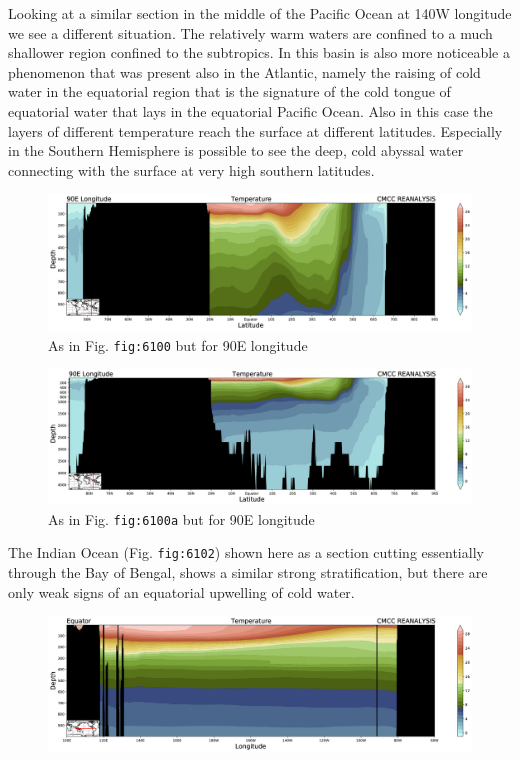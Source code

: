 Looking at a similar section in the middle of the Pacific Ocean at 140W
longitude we see a different situation. The relatively warm waters are
confined to a much shallower region confined to the subtropics. In this
basin is also more noticeable a phenomenon that was present also in the
Atlantic, namely the raising of cold water in the equatorial region that
is the signature of the cold tongue of equatorial water that lays in the
equatorial Pacific Ocean. Also in this case the layers of different
temperature reach the surface at different latitudes. Especially in the
Southern Hemisphere is possible to see the deep, cold abyssal water
connecting with the surface at very high southern latitudes.

\begin{figure}
\centering
\includegraphics[width = .7 \textwidth]{figs/GD/Sect90E1000.png}
\caption{As in Fig. \texttt{fig:6100} but for 90E longitude}
\end{figure}

\begin{figure}
\centering
\includegraphics[width = .7 \textwidth]{figs/GD/Sect90E5000.png}
\caption{As in Fig. \texttt{fig:6100a} but for 90E longitude}
\end{figure}

The Indian Ocean (Fig. \texttt{fig:6102}) shown here as a section
cutting essentially through the Bay of Bengal, shows a similar strong
stratification, but there are only weak signs of an equatorial upwelling
of cold water.

\begin{figure}
\centering
\includegraphics[width = .7 \textwidth]{figs/GD/SectEquator1000.png}
\caption{} \label{fig:}
\end{figure}

